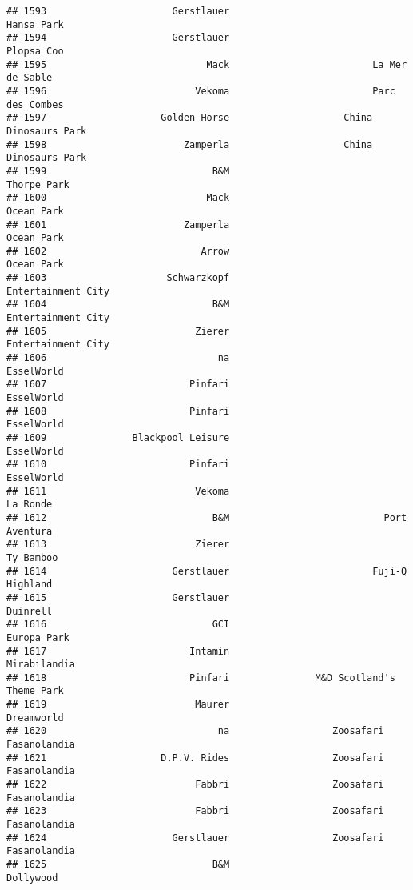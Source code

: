 \documentclass[
]{article}
\begin{document}
\begin{verbatim}
## 1593                      Gerstlauer                              Hansa Park
## 1594                      Gerstlauer                              Plopsa Coo
## 1595                            Mack                         La Mer de Sable
## 1596                          Vekoma                         Parc des Combes
## 1597                    Golden Horse                    China Dinosaurs Park
## 1598                        Zamperla                    China Dinosaurs Park
## 1599                             B&M                             Thorpe Park
## 1600                            Mack                              Ocean Park
## 1601                        Zamperla                              Ocean Park
## 1602                           Arrow                              Ocean Park
## 1603                     Schwarzkopf                      Entertainment City
## 1604                             B&M                      Entertainment City
## 1605                          Zierer                      Entertainment City
## 1606                              na                              EsselWorld
## 1607                         Pinfari                              EsselWorld
## 1608                         Pinfari                              EsselWorld
## 1609               Blackpool Leisure                              EsselWorld
## 1610                         Pinfari                              EsselWorld
## 1611                          Vekoma                                La Ronde
## 1612                             B&M                           Port Aventura
## 1613                          Zierer                               Ty Bamboo
## 1614                      Gerstlauer                         Fuji-Q Highland
## 1615                      Gerstlauer                                Duinrell
## 1616                             GCI                             Europa Park
## 1617                         Intamin                            Mirabilandia
## 1618                         Pinfari               M&D Scotland's Theme Park
## 1619                          Maurer                              Dreamworld
## 1620                              na                  Zoosafari Fasanolandia
## 1621                    D.P.V. Rides                  Zoosafari Fasanolandia
## 1622                          Fabbri                  Zoosafari Fasanolandia
## 1623                          Fabbri                  Zoosafari Fasanolandia
## 1624                      Gerstlauer                  Zoosafari Fasanolandia
## 1625                             B&M                               Dollywood

\end{verbatim}
\end{document}
